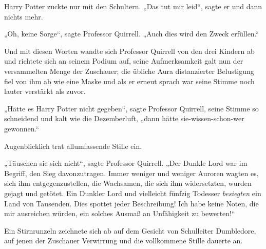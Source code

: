Harry Potter zuckte nur mit den Schultern.
„Das tut mir leid“, sagte er und dann nichts mehr.

„Oh, keine Sorge“, sagte Professor Quirrell.
„Auch dies wird den Zweck erfüllen.“

Und mit diesen Worten wandte sich Professor Quirrell von den drei Kindern ab und richtete sich an seinem Podium auf, seine Aufmerksamkeit galt nun der versammelten Menge der Zuschauer; die übliche Aura distanzierter Belustigung fiel von ihm ab wie eine Maske und als er erneut sprach war seine Stimme noch lauter verstärkt als zuvor.

„Hätte es Harry Potter nicht gegeben“, sagte Professor Quirrell, seine Stimme so schneidend und kalt wie die Dezemberluft, „dann hätte sie-wissen-schon-wer gewonnen.“

Augenblicklich trat allumfassende Stille ein.

\later

„Täuschen sie sich nicht“, sagte Professor Quirrell.
„Der Dunkle Lord war im Begriff, den Sieg davonzutragen. Immer weniger und weniger Auroren wagten es, sich ihm entgegenzustellen, die Wachsamen, die sich ihm widersetzten, wurden gejagt und getötet. Ein Dunkler Lord und vielleicht fünfzig Todesser \emph{besiegten} ein Land von Tausenden. Dies spottet jeder Beschreibung! Ich habe keine Noten, die mir ausreichen würden, ein solches Ausmaß an Unfähigkeit zu bewerten!“

Ein Stirnrunzeln zeichnete sich ab auf dem Gesicht von Schulleiter Dumbledore, auf jenen der Zuschauer Verwirrung und die vollkommene Stille dauerte an.

